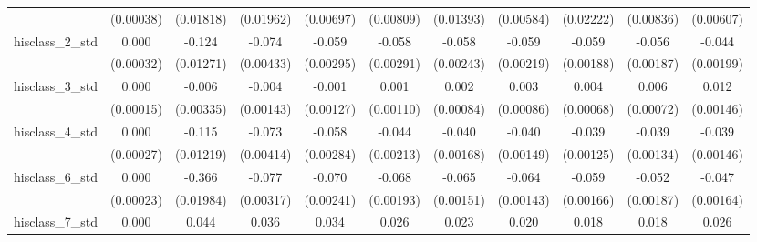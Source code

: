 {\begin{tabular}{l*{10}{c}}
                    &   (0.00038)         &   (0.01818)         &   (0.01962)         &   (0.00697)         &   (0.00809)         &   (0.01393)         &   (0.00584)         &   (0.02222)         &   (0.00836)         &   (0.00607)         \\
hisclass\_2\_std      &       0.000         &      -0.124\sym{***}&      -0.074\sym{***}&      -0.059\sym{***}&      -0.058\sym{***}&      -0.058\sym{***}&      -0.059\sym{***}&      -0.059\sym{***}&      -0.056\sym{***}&      -0.044\sym{***}\\
                    &   (0.00032)         &   (0.01271)         &   (0.00433)         &   (0.00295)         &   (0.00291)         &   (0.00243)         &   (0.00219)         &   (0.00188)         &   (0.00187)         &   (0.00199)         \\
hisclass\_3\_std      &       0.000         &      -0.006         &      -0.004\sym{**} &      -0.001         &       0.001         &       0.002         &       0.003\sym{**} &       0.004\sym{***}&       0.006\sym{***}&       0.012\sym{***}\\
                    &   (0.00015)         &   (0.00335)         &   (0.00143)         &   (0.00127)         &   (0.00110)         &   (0.00084)         &   (0.00086)         &   (0.00068)         &   (0.00072)         &   (0.00146)         \\
hisclass\_4\_std      &       0.000         &      -0.115\sym{***}&      -0.073\sym{***}&      -0.058\sym{***}&      -0.044\sym{***}&      -0.040\sym{***}&      -0.040\sym{***}&      -0.039\sym{***}&      -0.039\sym{***}&      -0.039\sym{***}\\
                    &   (0.00027)         &   (0.01219)         &   (0.00414)         &   (0.00284)         &   (0.00213)         &   (0.00168)         &   (0.00149)         &   (0.00125)         &   (0.00134)         &   (0.00146)         \\
hisclass\_6\_std      &       0.000         &      -0.366\sym{***}&      -0.077\sym{***}&      -0.070\sym{***}&      -0.068\sym{***}&      -0.065\sym{***}&      -0.064\sym{***}&      -0.059\sym{***}&      -0.052\sym{***}&      -0.047\sym{***}\\
                    &   (0.00023)         &   (0.01984)         &   (0.00317)         &   (0.00241)         &   (0.00193)         &   (0.00151)         &   (0.00143)         &   (0.00166)         &   (0.00187)         &   (0.00164)         \\
hisclass\_7\_std      &       0.000         &       0.044\sym{***}&       0.036\sym{***}&       0.034\sym{***}&       0.026\sym{***}&       0.023\sym{***}&       0.020\sym{***}&       0.018\sym{***}&       0.018\sym{***}&       0.026\sym{***}\\

\end{tabular}}

